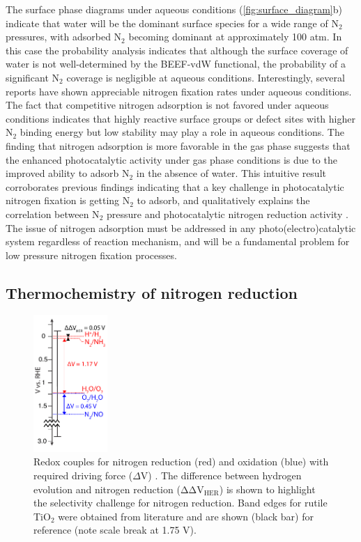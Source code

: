 \documentclass[journal=ascecg,manuscript=article,articletitle=true]{achemso}
\begin{document}
The surface phase diagrams under aqueous conditions (\ref{fig:surface_diagram}b) indicate that water will be the dominant surface species for a wide range of N$_2$ pressures, with adsorbed N$_2$ becoming dominant at approximately 100 atm. In this case the probability analysis indicates that although the surface coverage of water is not well-determined by the BEEF-vdW functional, the probability of a significant N$_2$ coverage is negligible at aqueous conditions. Interestingly, several reports have shown appreciable nitrogen fixation rates under aqueous conditions. \cite{Augugliaro_1982,Hirakawa_2017} The fact that competitive nitrogen adsorption is not favored under aqueous conditions indicates that highly reactive surface groups or defect sites with higher N$_2$ binding energy but low stability may play a role in aqueous conditions. The finding that nitrogen adsorption is more favorable in the gas phase suggests that the enhanced photocatalytic activity under gas phase conditions is due to the improved ability to adsorb N$_2$ in the absence of water. This intuitive result corroborates previous findings indicating that a key challenge in photocatalytic nitrogen fixation is getting N$_2$ to adsorb\cite{Zhu_2013,Vettraino_2002,Schrauzer_2011}, and qualitatively explains the  correlation between N$_2$ pressure and photocatalytic nitrogen reduction activity \cite{Schrauzer_2011,Ali_2016}. The issue of nitrogen adsorption must be addressed in any photo(electro)catalytic system regardless of reaction mechanism, and will be a fundamental problem for low pressure nitrogen fixation processes.

\subsection{Thermochemistry of nitrogen reduction}

\begin{figure}[h]
\centering

\includegraphics[width=0.25\textwidth]{figures/N2_redox_ladder.pdf}
\caption{Redox couples for nitrogen reduction (red) and oxidation (blue) with required driving force ($\Delta$V) \cite{Medford_2017}. The difference between hydrogen evolution and nitrogen reduction ($\mathrm{\Delta \Delta V_{HER}}$) is shown to highlight the selectivity challenge for nitrogen reduction. Band edges for rutile TiO$_2$ were obtained from literature \cite{Nozik_1996}  and are shown (black bar) for reference (note scale break at 1.75 V).}
\label{fig:redox_ladder}
\end{figure}
\end{document}
